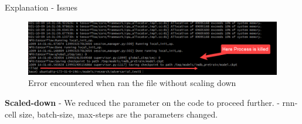 \documentclass[aspectratio=169,xcolor=dvipsnames]{beamer}
\begin{document}
\begin{frame}{Explanation - Issues}
    \tableofcontents

  \begin{figure}
   \caption{Error encountered when ran the file without scaling down}
   \includegraphics[width=450]{Killed-aws.png}
\end{figure}

\textbf{Scaled-down}
        - We reduced the parameter on the code to proceed further. \break
        - \alert{rnn-cell size, batch-size, max-steps} are the parameters changed.

  
\end{frame}
\end{document}
